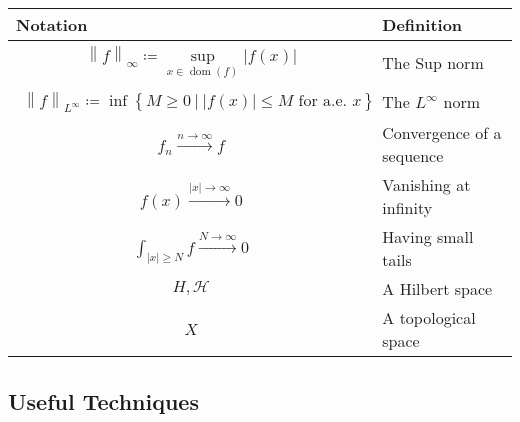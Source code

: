 \begin{longtable}[]{@{}
  >{\raggedright\arraybackslash}p{}
  >{\raggedright\arraybackslash}p{}@{}}
\toprule
Notation & Definition \\
\midrule
\endhead
\begin{align*}{\left\lVert {f} \right\rVert}_\infty \coloneqq\sup_{x\in \operatorname{dom}(f)} {\left\lvert {f(x)} \right\rvert}\end{align*}
& The Sup norm \\
\begin{align*} {\left\lVert {f} \right\rVert}_{L^\infty} \coloneqq\inf\left\{{M \geq 0 {~\mathrel{\Big|}~}{\left\lvert {f(x)} \right\rvert} \leq M \text{ for a.e. } x }\right\} \end{align*}
& The \(L^ \infty\) norm \\
\begin{align*} f_n \overset{n \to \infty }\to f \end{align*}
& Convergence of a sequence \\
\begin{align*} f(x) \overset{{\left\lvert {x} \right\rvert} \to \infty}\to 0 \end{align*}
& Vanishing at infinity \\
\begin{align*} \int_{{\left\lvert {x} \right\rvert} \geq N} f \overset{N\to \infty}\to 0 \end{align*}
& Having small tails \\
\begin{align*} H, \mathcal{H} \end{align*}
& A Hilbert space \\
\begin{align*} X \end{align*}
& A topological space \\
\bottomrule
\end{longtable}

\hypertarget{useful-techniques}{%
\subsection{Useful Techniques}\label{useful-techniques}}

